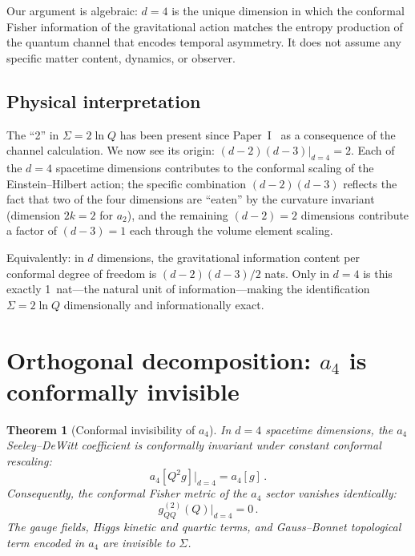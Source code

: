 \documentclass[prd,twocolumn,superscriptaddress,longbibliography]{revtex4-2}
\newtheorem{theorem}{Theorem}
\begin{document}
Our argument is algebraic: $d=4$ is the unique dimension
in which the conformal Fisher information of the gravitational
action matches the entropy production of the quantum channel
that encodes temporal asymmetry.
It does not assume any specific matter content, dynamics, or
observer.

\subsection{Physical interpretation}

The ``2'' in $\Sigma = 2\ln Q$ has been present since
Paper~I~\cite{PaperI} as a consequence of the channel
calculation.
We now see its origin: $(d-2)(d-3)\big|_{d=4}=2$.
Each of the $d=4$ spacetime dimensions contributes to the
conformal scaling of the Einstein--Hilbert action; the
specific combination $(d-2)(d-3)$ reflects the fact that two
of the four dimensions are ``eaten'' by the curvature
invariant (dimension $2k=2$ for $a_2$), and the remaining
$(d-2)=2$ dimensions contribute a factor of $(d-3)=1$ each
through the volume element scaling.

Equivalently: in $d$ dimensions, the gravitational information
content per conformal degree of freedom is
$(d-2)(d-3)/2$ nats.
Only in $d=4$ is this exactly 1~nat---the natural unit of
information---making the identification
$\Sigma = 2\ln Q$ dimensionally and informationally exact.


\section{Orthogonal decomposition: $a_4$ is conformally invisible}
\label{sec:orthogonal}

\begin{theorem}[Conformal invisibility of $a_4$]
\label{thm:orthogonal}
In $d=4$ spacetime dimensions, the $a_4$ Seeley--DeWitt
coefficient is conformally invariant under constant conformal
rescaling:
\begin{equation}\label{eq:a4_invariant}
  a_4[Q^2 g]\big|_{d=4} = a_4[g]\,.
\end{equation}
Consequently, the conformal Fisher metric of the $a_4$ sector
vanishes identically:
\begin{equation}\label{eq:gQQ_a4}
  g_{QQ}^{(2)}(Q)\big|_{d=4} = 0\,.
\end{equation}
The gauge fields, Higgs kinetic and quartic terms, and
Gauss--Bonnet topological term encoded in $a_4$ are
\emph{invisible} to $\Sigma$.
\end{theorem}
\end{document}

